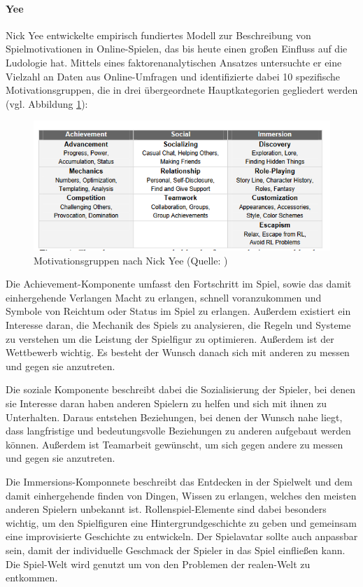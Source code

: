 \paragraph{Yee}
Nick Yee entwickelte empirisch fundiertes Modell zur Beschreibung von Spielmotivationen in Online-Spielen, das bis heute einen großen Einfluss auf die Ludologie hat. Mittels eines faktorenanalytischen Ansatzes untersuchte er eine Vielzahl an Daten aus Online-Umfragen und identifizierte dabei 10 spezifische Motivationsgruppen, die in drei übergeordnete Hauptkategorien gegliedert werden (vgl. Abbildung \ref{fig:nick_yee_motivations}):

\begin{figure}[ht]
\centering
\includegraphics[width=1\linewidth]{content/pictures/nick_yee_categorizations.PNG}
\caption{Motivationsgruppen nach Nick Yee (Quelle: \cite{yee_motivations_nodate})}
\label{fig:nick_yee_motivations}
\end{figure}

Die Achievement-Komponente umfasst den Fortschritt im Spiel, sowie das damit einhergehende Verlangen Macht zu erlangen, schnell voranzukommen und Symbole von Reichtum oder Status im Spiel zu erlangen. Außerdem existiert ein Interesse daran, die Mechanik des Spiels zu analysieren, die Regeln und Systeme zu verstehen um die Leistung der Spielfigur zu optimieren. Außerdem ist der Wettbewerb wichtig. Es besteht der Wunsch danach sich mit anderen zu messen und gegen sie anzutreten.

Die soziale Komponente beschreibt dabei die Sozialisierung der Spieler, bei denen sie Interesse daran haben anderen Spielern zu helfen und sich mit ihnen zu Unterhalten. Daraus entstehen Beziehungen, bei denen der Wunsch nahe liegt, dass langfristige und bedeutungsvolle Beziehungen zu anderen aufgebaut werden können. Außerdem ist Teamarbeit gewünscht, um sich gegen andere zu messen und gegen sie anzutreten.

Die Immersions-Komponnete beschreibt das Entdecken in der Spielwelt und dem damit einhergehende finden von Dingen, Wissen zu erlangen, welches den meisten anderen Spielern unbekannt ist. Rollenspiel-Elemente sind dabei besonders wichtig, um den Spielfiguren eine Hintergrundgeschichte zu geben und gemeinsam eine improvisierte Geschichte zu entwickeln. Der Spielavatar sollte auch anpassbar sein, damit der individuelle Geschmack der Spieler in das Spiel einfließen kann. Die Spiel-Welt wird genutzt um von den Problemen der realen-Welt zu entkommen.

